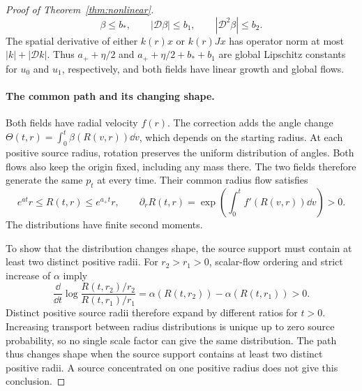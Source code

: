 \begin{proof}[Proof of Theorem~\ref{thm:nonlinear}]
\[
 \beta\le b_*,\qquad |\mathcal D \beta|\le b_1,\qquad |\mathcal D^2\beta|\le b_2.
\]
The spatial derivative of either $k(r)x$ or $k(r)Jx$ has operator norm at most $|k|+|\mathcal D k|$. Thus $a_++\eta/2$ and $a_++\eta/2+b_*+b_1$ are global Lipschitz constants for $u_0$ and $u_1$, respectively, and both fields have linear growth and global flows.

\paragraph{The common path and its changing shape.}
Both fields have radial velocity $f(r)$. The correction adds the angle change $\Theta(t,r)=\int_0^t\beta(R(v,r))\dd v$, which depends on the starting radius. At each positive source radius, rotation preserves the uniform distribution of angles. Both flows also keep the origin fixed, including any mass there. The two fields therefore generate the same $p_t$ at every time. Their common radius flow satisfies
\begin{equation}
 e^{at}r\le R(t,r)\le e^{a_+t}r,\qquad
 \partial_rR(t,r)=\exp\left(\int_0^t f'(R(v,r))\dd v\right)>0.
 \label{eq:radial-flow-growth}
\end{equation}
The distributions have finite second moments.

To show that the distribution changes shape, the source support must contain at least two distinct positive radii. For $r_2>r_1>0$, scalar-flow ordering and strict increase of $\alpha$ imply
\[
 \frac{\dd}{\dd t}\log\frac{R(t,r_2)/r_2}{R(t,r_1)/r_1}
 =\alpha(R(t,r_2))-\alpha(R(t,r_1))>0.
\]
Distinct positive source radii therefore expand by different ratios for $t>0$. Increasing transport between radius distributions is unique up to zero source probability, so no single scale factor can give the same distribution. The path thus changes shape when the source support contains at least two distinct positive radii. A source concentrated on one positive radius does not give this conclusion.


\end{proof}
